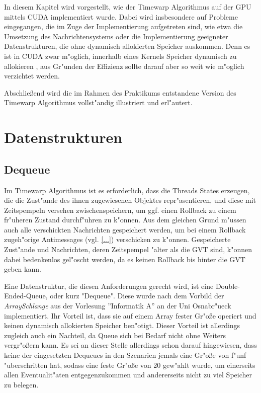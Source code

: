\documentclass{scrreprt}
\begin{document}
In diesem Kapitel wird vorgestellt, wie der Timewarp Algorithmus auf der GPU mittels CUDA implementiert wurde. Dabei wird
insbesondere auf Probleme eingegangen, die im Zuge der Implementierung aufgetreten sind, wie etwa die Umsetzung des
Nachrichtensystems oder die Implementierung geeigneter Datenstrukturen, die ohne dynamisch allokierten Speicher
auskommen. Denn es ist in CUDA zwar m"oglich, innerhalb eines Kernels Speicher dynamisch zu allokieren \cite{...}, aus
Gr"unden der Effizienz sollte darauf aber so weit wie m"oglich verzichtet werden.

Abschlie\ss end wird die im Rahmen des Praktikums entstandene Version des Timewarp Algorithmus vollst"andig illustriert
und erl"autert.

\section{Datenstrukturen}
\subsection{Dequeue}
Im Timewarp Algorithmus ist es erforderlich, dass die Threads States erzeugen, die die Zust"ande des ihnen zugewiesenen
Objektes repr"asentieren, und diese mit Zeitspempeln versehen zwischenspeichern, um ggf. einen Rollback zu einem
fr"uheren Zustand durchf"uhren zu k"onnen. Aus dem gleichen Grund m"ussen auch alle verschickten Nachrichten gespeichert
werden, um bei einem Rollback zugeh"orige Antimessages (vgl. \ref{...}) verschicken zu k"onnen.
Gespeicherte Zust"ande und Nachrichten, deren Zeitspempel "alter als die GVT sind, k"onnen dabei bedenkenlos gel"oscht
werden, da es keinen Rollback bis hinter die GVT geben kann.

Eine Datenstruktur, die diesen Anforderungen gerecht wird, ist eine Double-Ended-Queue, oder kurz "Dequeue". Diese wurde
nach dem Vorbild der \emph{ArraySchlange} aus der Vorlesung ''Informatik A'' \cite{...} an der Uni Osnabr"ueck
implementiert. Ihr Vorteil ist, dass sie auf einem Array fester Gr"o\ss e operiert und keinen dynamisch allokierten
Speicher ben"otigt. Dieser Vorteil ist allerdings zugleich auch ein Nachteil, da Queue sich bei Bedarf nicht ohne
Weiters vergr"o\ss ern kann. Es sei an dieser Stelle allerdings schon darauf hingewiesen, dass keine der eingesetzten
Dequeues in den Szenarien jemals eine Gr"o\ss e von f"unf "uberschritten hat, sodass eine feste Gr"o\ss e von 20
gew"ahlt wurde, um einerseits allen Eventualit"aten entgegenzukommen und andererseits nicht zu viel Speicher zu belegen.
\end{document}

